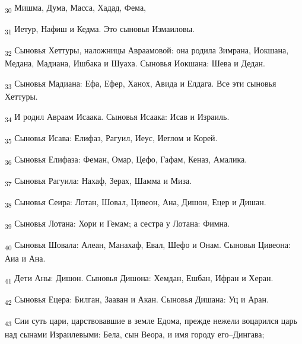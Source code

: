\begin{tcolorbox}
\textsubscript{30} Мишма, Дума, Масса, Хадад, Фема,
\end{tcolorbox}
\begin{tcolorbox}
\textsubscript{31} Иетур, Нафиш и Кедма. Это сыновья Измаиловы.
\end{tcolorbox}
\begin{tcolorbox}
\textsubscript{32} Сыновья Хеттуры, наложницы Авраамовой: она родила Зимрана, Иокшана, Медана, Мадиана, Ишбака и Шуаха. Сыновья Иокшана: Шева и Дедан.
\end{tcolorbox}
\begin{tcolorbox}
\textsubscript{33} Сыновья Мадиана: Ефа, Ефер, Ханох, Авида и Елдага. Все эти сыновья Хеттуры.
\end{tcolorbox}
\begin{tcolorbox}
\textsubscript{34} И родил Авраам Исаака. Сыновья Исаака: Исав и Израиль.
\end{tcolorbox}
\begin{tcolorbox}
\textsubscript{35} Сыновья Исава: Елифаз, Рагуил, Иеус, Иеглом и Корей.
\end{tcolorbox}
\begin{tcolorbox}
\textsubscript{36} Сыновья Елифаза: Феман, Омар, Цефо, Гафам, Кеназ, Амалика.
\end{tcolorbox}
\begin{tcolorbox}
\textsubscript{37} Сыновья Рагуила: Нахаф, Зерах, Шамма и Миза.
\end{tcolorbox}
\begin{tcolorbox}
\textsubscript{38} Сыновья Сеира: Лотан, Шовал, Цивеон, Ана, Дишон, Ецер и Дишан.
\end{tcolorbox}
\begin{tcolorbox}
\textsubscript{39} Сыновья Лотана: Хори и Гемам; а сестра у Лотана: Фимна.
\end{tcolorbox}
\begin{tcolorbox}
\textsubscript{40} Сыновья Шовала: Алеан, Манахаф, Евал, Шефо и Онам. Сыновья Цивеона: Аиа и Ана.
\end{tcolorbox}
\begin{tcolorbox}
\textsubscript{41} Дети Аны: Дишон. Сыновья Дишона: Хемдан, Ешбан, Ифран и Херан.
\end{tcolorbox}
\begin{tcolorbox}
\textsubscript{42} Сыновья Ецера: Билган, Зааван и Акан. Сыновья Дишана: Уц и Аран.
\end{tcolorbox}
\begin{tcolorbox}
\textsubscript{43} Сии суть цари, царствовавшие в земле Едома, прежде нежели воцарился царь над сынами Израилевыми: Бела, сын Веора, и имя городу его--Дингава;
\end{tcolorbox}
